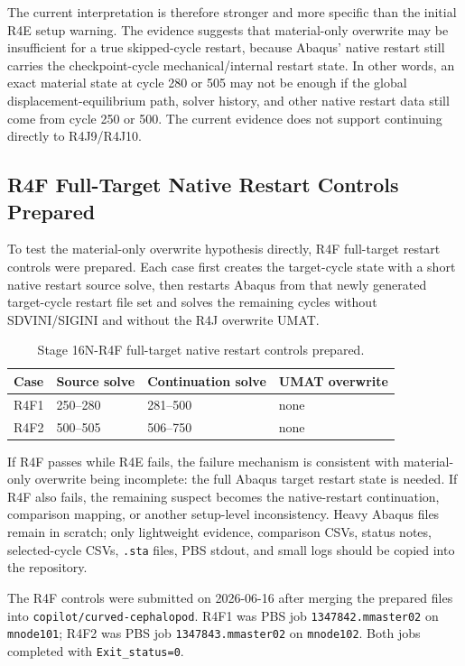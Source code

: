 \documentclass[11pt,a4paper]{article}
\newcommand{\code}[1]{\texttt{#1}}
\begin{document}
The current interpretation is therefore stronger and more specific than the initial R4E setup warning. The evidence suggests that material-only overwrite may be insufficient for a true skipped-cycle restart, because Abaqus' native restart still carries the checkpoint-cycle mechanical/internal restart state. In other words, an exact material state at cycle 280 or 505 may not be enough if the global displacement-equilibrium path, solver history, and other native restart data still come from cycle 250 or 500. The current evidence does not support continuing directly to R4J9/R4J10.

\subsection{R4F Full-Target Native Restart Controls Prepared}

To test the material-only overwrite hypothesis directly, R4F full-target restart controls were prepared. Each case first creates the target-cycle state with a short native restart source solve, then restarts Abaqus from that newly generated target-cycle restart file set and solves the remaining cycles without SDVINI/SIGINI and without the R4J overwrite UMAT.

\begin{table}[H]
\centering
\caption{Stage 16N-R4F full-target native restart controls prepared.}
\begin{tabular}{llll}
\toprule
Case & Source solve & Continuation solve & UMAT overwrite \\
\midrule
R4F1 & 250--280 & 281--500 & none \\
R4F2 & 500--505 & 506--750 & none \\
\bottomrule
\end{tabular}
\end{table}

If R4F passes while R4E fails, the failure mechanism is consistent with material-only overwrite being incomplete: the full Abaqus target restart state is needed. If R4F also fails, the remaining suspect becomes the native-restart continuation, comparison mapping, or another setup-level inconsistency. Heavy Abaqus files remain in scratch; only lightweight evidence, comparison CSVs, status notes, selected-cycle CSVs, \code{.sta} files, PBS stdout, and small logs should be copied into the repository.

The R4F controls were submitted on 2026-06-16 after merging the prepared files into \code{copilot/curved-cephalopod}. R4F1 was PBS job \code{1347842.mmaster02} on \code{mnode101}; R4F2 was PBS job \code{1347843.mmaster02} on \code{mnode102}. Both jobs completed with \code{Exit\_status=0}.
\end{document}
